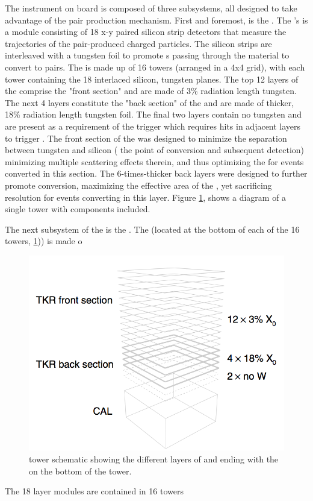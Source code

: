 The \lat{} instrument on board \Fermi{} is composed of three subsystems, all designed to take advantage of the pair production mechanism. First and foremost, is the \tkr{}. The \lat{}'s \tkr{} is a module consisting of 18 x-y paired silicon strip detectors that measure the trajectories of the pair-produced charged particles. The silicon strips are interleaved with a tungsten foil to promote \gam{}s passing through the material to convert to \ee{} pairs. The \lat{} is made up of 16 towers (arranged in a 4x4 grid), with each tower containing the 18 interlaced silicon, tungsten planes. The top 12 layers of the \tkr{} comprise the "front section" and are made of 3\% radiation length tungsten. The next 4 layers constitute the "back section" of the \tkr{} and are made of thicker, 18\% radiation length tungsten foil. The final two \tkr{} layers contain no tungsten and are present as a requirement of the \tkr{} trigger which requires hits in adjacent layers to trigger \cite{lat_perf}. The front section of the \tkr{} was designed to minimize the separation between tungsten and silicon (\ie{} the point of conversion and subsequent detection) minimizing multiple scattering effects therein, and thus optimizing the \psf{} for events converted in this section. The 6-times-thicker back layers were designed to further promote conversion, maximizing the effective area of the \lat{}, yet sacrificing resolution for events converting in this layer. Figure \ref{fig:Tower}, shows a diagram of a single tower with \tkr{} components included.

The next subsystem of the \lat{} is the \cal{}. The \cal{} (located at the bottom of each of the 16 towers, \ref{fig:Tower})) is made o

\begin{figure}[h!]
	\centering
	\includegraphics[width=1.0\columnwidth]{Figures/latPerf_Tower.png}
	\caption[\lat{} tower schematic ]{\lat{} tower schematic showing the different layers of \tkr{} and ending with the \cal{} on the bottom of the tower. }
	\label{fig:Tower}
\end{figure}
The 18 layer modules are contained in 16 towers

